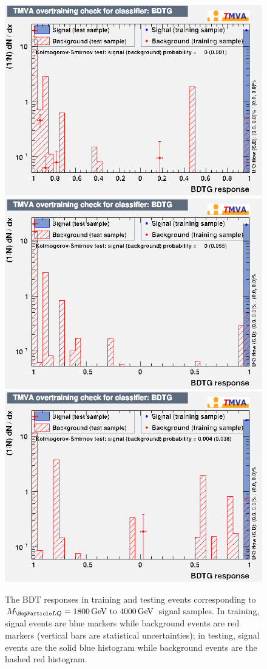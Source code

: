 \begin{figure}[H]
    {\includegraphics[width=.32\textwidth]{Images/Analysis/Results_LQToBMu_pair_uubj_BDTG_FullRun2_2023_01_25_020318/3000/overtrain_BDTG.png}}
    {\includegraphics[width=.32\textwidth]{Images/Analysis/Results_LQToBMu_pair_uubj_BDTG_FullRun2_2023_01_25_020318/3500/overtrain_BDTG.png}}
    {\includegraphics[width=.32\textwidth]{Images/Analysis/Results_LQToBMu_pair_uubj_BDTG_FullRun2_2023_01_25_020318/4000/overtrain_BDTG.png}}
    \caption{The BDT responses in training and testing events corresponding to $\MLQ = \SIrange{1800}{4000}{GeV}$ signal samples. In training, signal events are blue markers while background events are red markers (vertical bars are statistical uncertainties); in testing, signal events are the solid blue histogram while background events are the hashed red histogram.}
    \label{figapp:overtraining2}
\end{figure}

